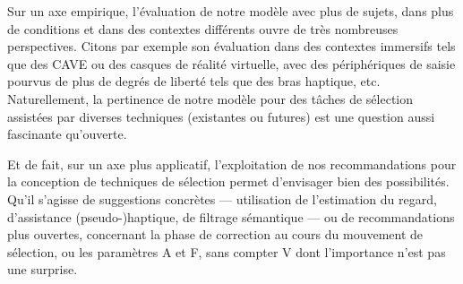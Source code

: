 	Sur un axe empirique, l'évaluation de notre modèle avec plus de sujets, dans plus de conditions et dans des contextes différents ouvre de très nombreuses perspectives. Citons par exemple son évaluation dans des contextes immersifs tels que des CAVE ou des casques de réalité virtuelle, avec des périphériques de saisie pourvus de plus de degrés de liberté tels que des bras haptique, etc. Naturellement, la pertinence de notre modèle pour des tâches de sélection assistées par diverses techniques (existantes ou futures) est une question aussi fascinante qu'ouverte.
	
	Et de fait, sur un axe plus applicatif, l'exploitation de nos recommandations pour la conception de techniques de sélection permet d'envisager bien des possibilités. Qu'il s'agisse de suggestions concrètes --- utilisation de l'estimation du regard, d'assistance (pseudo-)haptique, de filtrage sémantique --- ou de recommandations plus ouvertes, concernant la phase de correction au cours du mouvement de sélection, ou les paramètres A et F, sans compter V dont l'importance n'est pas une surprise.
	
	